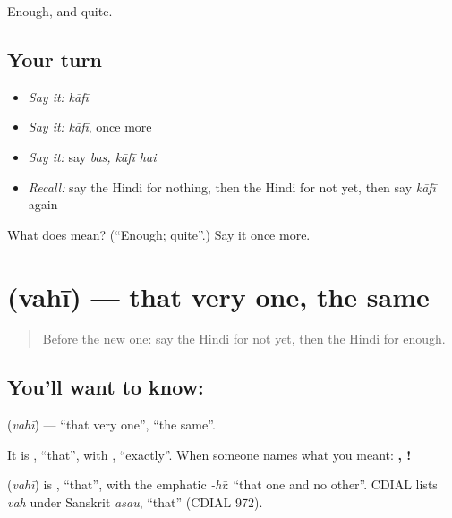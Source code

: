 \begin{grammarlens}[title={What you've built}]
Enough, and quite.
\end{grammarlens}

\subsection*{Your turn}
\begin{itemize}
\raggedright
  \item \emph{Say it:} \emph{kāfī}
  \item \emph{Say it:} \emph{kāfī}, once more
  \item \emph{Say it:} say \emph{bas, kāfī hai}
  \item \emph{Recall:} say the Hindi for nothing, then the Hindi for not yet, then say \emph{kāfī} again
\end{itemize}

\begin{tcolorbox}[breakable,colback=teal!4,colframe=teal!35!black,title={Before you move on}]
What does  mean? (\textquotedblleft{}Enough; quite\textquotedblright{}.) Say it once more.
\end{tcolorbox}
\section[\texorpdfstring{\hi{वही} (vahī)}{वही (vahī)}]{ (vahī) — that very one, the same}

\label{lesson:HI-C113-vahi}



\begin{quote}
Before the new one: say the Hindi for not yet, then the Hindi for enough.
\end{quote}

\subsection*{You'll want to know: }
\textbf{} (\emph{vahī}) — \textquotedblleft{}that very one\textquotedblright{}, \textquotedblleft{}the same\textquotedblright{}.

It is \textbf{}, \textquotedblleft{}that\textquotedblright{}, with \textbf{}, \textquotedblleft{}exactly\textquotedblright{}. When someone names what you meant: \textbf{, !}

\begin{cousinweb}
\textbf{} (\emph{vahī}) is \textbf{}, \textquotedblleft{}that\textquotedblright{}, with the emphatic \emph{-hī}: \textquotedblleft{}that one and no other\textquotedblright{}. CDIAL lists \emph{vah} under Sanskrit \emph{asau}, \textquotedblleft{}that\textquotedblright{} (CDIAL 972).
\end{cousinweb}

